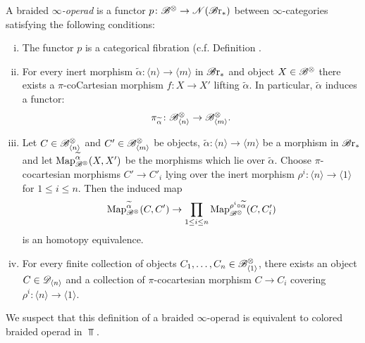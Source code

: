\begin{defin} 
    A braided $\infty${\em-operad} is a functor $p \colon \mathscr{B}^{\otimes} \to \mathscr{N}(\mathscr{B} \text{r}_{\ast})$
    between $\infty$-categories satisfying the following conditions:
    \begin{enumerate}[(i)]
         \item The functor $p$ is a categorical fibration (c.f. Definition \cite[Corollary 2.4.6.5]{hht}.

        \item For every inert morphism $\widetilde{\alpha} \colon \langle n \rangle
        \to \langle m \rangle$ in $\mathscr{B} \text{r}_{\ast}$ and object $X \in \mathscr{B}^{\otimes}$ there exists a
        $\pi$-coCartesian morphism $f \colon X \to X'$ lifting $\widetilde{\alpha}$. In
        particular, $\widetilde{\alpha}$ induces a functor: $$\pi_{\widetilde{\alpha}} \colon
        \mathscr{B}^{\otimes}_{\langle n \rangle} \to \mathscr{B}^{\otimes}_{\langle m \rangle}.$$


    \item Let $C \in \mathscr{B}^{\otimes}_{\langle n \rangle}$ and $C' \in \mathscr{B}^{\otimes}_{\langle m \rangle}$
    be objects, $\widetilde{\alpha}  : \langle n \rangle \to \langle m \rangle$
    be a morphism in $\mathscr{B} \text{r}_{\ast}$ and let $\operatorname{Map}_{\mathscr{B}^{\otimes}}^{\widetilde{\alpha}}(X, X')$ be the 
    morphisms which lie over $\widetilde{\alpha}$. 
    Choose $\pi$-cocartesian morphisms $C' \to C'_i$ lying over the inert
    morphism $\rho^i \colon \langle n \rangle \to \langle 1 \rangle$ for $1 \leq
    i \leq n$. Then the induced map
    \[
        \operatorname{Map}_{\mathscr{B}^{\otimes}}^{\widetilde{\alpha}}(C, C') \to \prod_{1 \leq i \leq n} \operatorname{Map}_{\mathscr{B}^{\otimes}}^{\rho^i \circ \widetilde{\alpha}}(C, C_i')
    \]
    is an homotopy equivalence.
    
    \item For every finite collection of objects $C_1, \dots, C_n \in
    \mathscr{B}^{\otimes}_{\langle 1 \rangle}$, there exists an object $C \in \mathscr{D}_{\langle n
    \rangle}$ and a collection of $\pi$-cocartesian morphism $C \to C_i$
    covering $\rho^i \colon \langle n \rangle \to \langle 1 \rangle$.
    \end{enumerate}
\end{defin}
We suspect that this definition of a braided $\infty$-operad is equivalent to colored braided operad in $\Top$.
 
